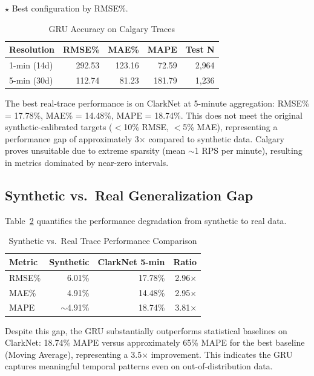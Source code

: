 \documentclass[conference,letterpaper]{IEEEtran}
\begin{document}
$\star$ Best configuration by RMSE\%.

\begin{table}[htbp]
\caption{GRU Accuracy on Calgary Traces}
\label{tab:calgary}
\centering
\small
\begin{tabular}{lrrrr}
\toprule
\textbf{Resolution} & \textbf{RMSE\%} & \textbf{MAE\%} & \textbf{MAPE} & \textbf{Test N} \\
\midrule
1-min (14d) & 292.53 & 123.16 & 72.59 & 2{,}964 \\
5-min (30d) & 112.74 & 81.23 & 181.79 & 1{,}236 \\
\bottomrule
\end{tabular}
\end{table}

The best real-trace performance is on ClarkNet at 5-minute aggregation: RMSE\% = 17.78\%, MAE\% = 14.48\%, MAPE = 18.74\%. This does not meet the original synthetic-calibrated targets ($<$10\% RMSE, $<$5\% MAE), representing a performance gap of approximately 3$\times$ compared to synthetic data. Calgary proves unsuitable due to extreme sparsity (mean $\sim$1 RPS per minute), resulting in metrics dominated by near-zero intervals.

\subsection{Synthetic vs.\ Real Generalization Gap}

Table~\ref{tab:gap} quantifies the performance degradation from synthetic to real data.

\begin{table}[htbp]
\caption{Synthetic vs.\ Real Trace Performance Comparison}
\label{tab:gap}
\centering
\small
\begin{tabular}{lrrr}
\toprule
\textbf{Metric} & \textbf{Synthetic} & \textbf{ClarkNet 5-min} & \textbf{Ratio} \\
\midrule
RMSE\% & 6.01\% & 17.78\% & 2.96$\times$ \\
MAE\% & 4.91\% & 14.48\% & 2.95$\times$ \\
MAPE & $\sim$4.91\% & 18.74\% & 3.81$\times$ \\
\bottomrule
\end{tabular}
\end{table}

Despite this gap, the GRU substantially outperforms statistical baselines on ClarkNet: 18.74\% MAPE versus approximately 65\% MAPE for the best baseline (Moving Average), representing a 3.5$\times$ improvement. This indicates the GRU captures meaningful temporal patterns even on out-of-distribution data.
\end{document}

